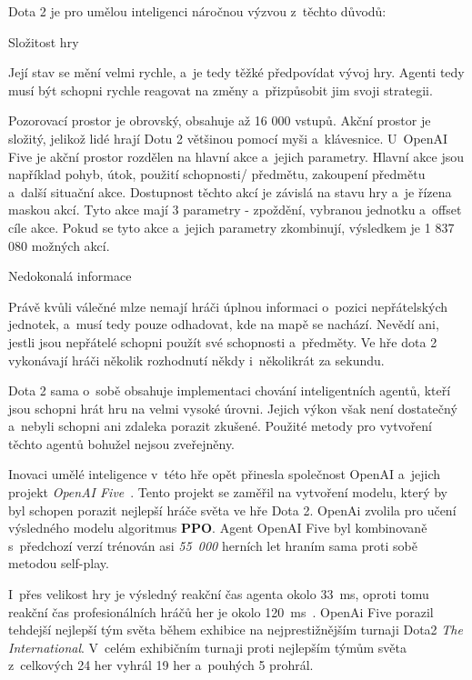 Dota 2 je pro umělou inteligenci náročnou výzvou z~těchto důvodů:
\begin{myitemize}
  \item Složitost hry

  Její stav se mění velmi rychle, a~je tedy těžké předpovídat vývoj hry.
  Agenti tedy musí být schopni rychle reagovat na změny a~přizpůsobit jim svoji strategii.

  Pozorovací prostor je obrovský, obsahuje až 16 000 vstupů.
  Akční prostor je složitý, jelikož lidé hrají Dotu 2 většinou pomocí myši a~klávesnice.
  U~OpenAI Five je akční prostor rozdělen na hlavní akce a~jejich parametry.
  Hlavní akce jsou například pohyb, útok, použití schopnosti/ předmětu, zakoupení předmětu a~další situační akce.
  Dostupnost těchto akcí je závislá na stavu hry a~je řízena maskou akcí.
  Tyto akce mají 3 parametry - zpoždění, vybranou jednotku a~offset cíle akce.
  Pokud se tyto akce a~jejich parametry zkombinují, výsledkem je 1 837 080 možných akcí.

  \item Nedokonalá informace

  Právě kvůli válečné mlze nemají hráči úplnou informaci o~pozici nepřátelských jednotek, a~musí tedy pouze odhadovat, kde na mapě se nachází.
  Nevědí ani, jestli jsou nepřátelé schopni použít své schopnosti a~předměty.
  Ve hře dota 2 vykonávají hráči několik rozhodnutí někdy i~několikrát za sekundu.
\end{myitemize}

Dota 2 sama o~sobě obsahuje implementaci chování inteligentních agentů, kteří jsou schopni hrát hru na velmi vysoké úrovni.
Jejich výkon však není dostatečný a~nebyli schopni ani zdaleka porazit zkušené.
Použité metody pro vytvoření těchto agentů bohužel nejsou zveřejněny.

Inovaci umělé inteligence v~této hře opět přinesla společnost OpenAI a~jejich projekt \emph{OpenAI Five}~\cite{Dota2}.
Tento projekt se zaměřil na vytvoření modelu, který by byl schopen porazit nejlepší hráče světa ve hře Dota 2.
OpenAi zvolila pro učení výsledného modelu algoritmus \textbf{PPO}.
Agent OpenAI Five byl kombinovaně s~předchozí verzí trénován asi \emph{55~000} herních let hraním sama proti sobě metodou self-play.

I~přes velikost hry je výsledný reakční čas agenta okolo 33~ms, oproti tomu reakční čas profesionálních hráčů her je okolo 120~ms~\cite{reaction_time}.
OpenAi Five porazil tehdejší nejlepší tým světa během exhibice na nejprestižnějším turnaji Dota2 \textit{The International}.
V~celém exhibičním turnaji proti nejlepším týmům světa z~celkových 24 her vyhrál 19 her a~pouhých 5 prohrál.

